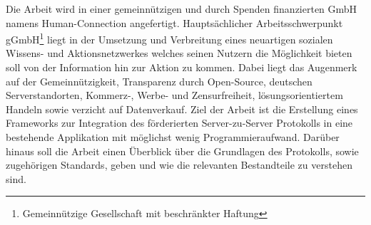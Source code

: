 {	Die Arbeit wird in einer gemeinnützigen und durch Spenden finanzierten GmbH namens Human-Connection angefertigt. Hauptsächlicher Arbeitsschwerpunkt gGmbH\footnote{Gemeinnützige Gesellschaft mit beschränkter Haftung} liegt in der Umsetzung und Verbreitung eines neuartigen sozialen Wissens- und Aktionsnetzwerkes welches seinen Nutzern die Möglichkeit bieten soll von der Information hin zur Aktion zu kommen. Dabei liegt das Augenmerk auf der Gemeinnützigkeit, Transparenz durch Open-Source, deutschen Serverstandorten, Kommerz-, Werbe- und Zensurfreiheit, lösungsorientiertem Handeln sowie verzicht auf Datenverkauf. Ziel der Arbeit ist die Erstellung eines Frameworks zur Integration des förderierten Server-zu-Server Protokolls in eine bestehende Applikation mit möglichst wenig Programmieraufwand. Darüber hinaus soll die Arbeit einen Überblick über die Grundlagen des Protokolls, sowie zugehörigen Standards, geben und wie die relevanten Bestandteile zu verstehen sind.
}

